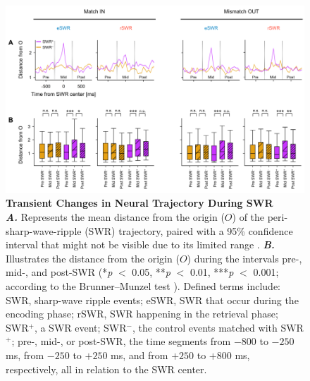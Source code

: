 \documentclass[final,3p,times,twocolumn]{elsarticle}
\begin{document}
        \clearpage
        \begin{figure}[ht]
        	\centering
            \includegraphics[width=1\textwidth]{./src/figures/.png/Figure_ID_05.png}
        	\caption{\textbf{Transient Changes in Neural Trajectory During SWR}
\smallskip
\\
\textbf{\textit{A.}} Represents the mean distance from the origin ($O$) of the peri-sharp-wave-ripple (SWR) trajectory, paired with a 95\% confidence interval that might not be visible due to its limited range \cite{girardeau_selective_2009,norman_hippocampal_2019,buzsaki_hippocampal_2015}. \textbf{\textit{B.}} Illustrates the distance from the origin ($O$) during the intervals pre-, mid-, and post-SWR (*\textit{p} $<$ 0.05, **\textit{p} $<$ 0.01, ***\textit{p} $<$ 0.001; according to the Brunner--Munzel test \cite{boran_persistent_2019}). Defined terms include: SWR, sharp-wave ripple events; eSWR, SWR that occur during the encoding phase; rSWR, SWR happening in the retrieval phase; SWR$^+$, a SWR event; SWR$^-$, the control events matched with SWR$^+$; pre-, mid-, or post-SWR, the time segments from $-800$ to $-250$ ms, from $-250$ to $+250$ ms, and from $+250$ to $+800$ ms, respectively, all in relation to the SWR center.
}
        	\label{fig:05}
        \end{figure}
        \clearpage
\end{document}

